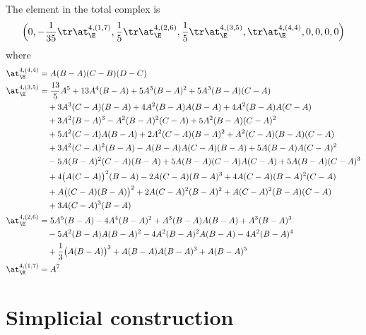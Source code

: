         The element in the total complex is
        \begin{equation}
            \Big(0,-\frac{1}{35}\tr\at_\E^{4,(1,7)},\frac15\tr\at_\E^{4,(2,6)},\frac15\tr\at_\E^{4,(3,5)},\tr\at_\E^{4,(4,4)},0,0,0,0\Big)
        \end{equation}
        where
        \begin{align*}
            \at_\E^{4,(4,4)}
            &= A(B-A)(C-B)(D-C)\\
            \at_\E^{4,(3,5)}
            &=
            \frac{13}{5} A^5
            +13 A^4(B-A)
            +5 A^3(B-A)^2
            +5 A^3(B-A)(C-A)\\
            &\quad+3 A^3(C-A)(B-A)
            +4 A^2(B-A)A(B-A)
            +4 A^2(B-A)A(C-A)\\
            &\quad+3 A^2(B-A)^3
            - A^2(B-A)^2(C-A)
            +5A^2(B-A)(C-A)^2\\
            &\quad+5A^2(C-A)A(B-A)
            +2 A^2(C-A)(B-A)^2
            + A^2(C-A)(B-A)(C-A)\\
            &\quad+3 A^2(C-A)^2(B-A)
            - A(B-A)A(C-A)(B-A)
            +5 A(B-A)A(C-A)^2\\
            &\quad-5 A(B-A)^2(C-A)(B-A)
            +5 A(B-A)(C-A)A(C-A)
            +5 A(B-A)(C-A)^3\\
            &\quad+4 \big(A(C-A)\big)^2(B-A)
            -2 A(C-A)(B-A)^3
            +4 A(C-A)(B-A)^2(C-A)\\
            &\quad+ A\big((C-A)(B-A)\big)^2
            +2 A(C-A)^2(B-A)^2
            + A(C-A)^2(B-A)(C-A)\\
            &\quad+3 A(C-A)^3(B-A)\\
            \at_\E^{4,(2,6)}
            &=
            5 A^5(B-A)
            -4 A^4(B-A)^2
            + A^3(B-A)A(B-A)
            + A^3(B-A)^3\\
            &\quad-5 A^2(B-A)A(B-A)^2
            -4 A^2(B-A)^2A(B-A)
            -4 A^2(B-A)^4\\
            &\quad+\frac{1}{3} \big(A(B-A)\big)^3
            + A(B-A)A(B-A)^3
            + A(B-A)^5\\
            \at_\E^{4,(1,7)}
            &= A^7
        \end{align*}





\section{Simplicial construction} %
\label{sec:simplicial_construction}

